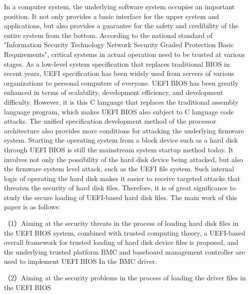 
\begin{eabstract}
In a computer system, the underlying software system occupies an important position. It not only 
provides a basic interface for the upper system and applications, but also provides a guarantee for 
the safety and credibility of the entire system from the bottom.
According to the national standard of 
"Information Security Technology Network Security Graded Protection Basic Requirements", critical 
systems in actual operation need to be trusted at various stages. As a low-level system specification 
that replaces traditional BIOS in recent years, UEFI specification has been widely used from servers 
of various organizations to personal computers of everyone. UEFI BIOS has been greatly enhanced in 
terms of scalability, development efficiency, and development difficulty. However, it is this C 
language that replaces the traditional assembly language program, which makes UEFI BIOS also subject 
to C language code attacks. The unified specification development method of the processor 
architecture also provides more conditions for attacking the underlying firmware system. 
Starting the operating system from a block device such as a hard disk through UEFI BIOS is 
still the mainstream system startup method today. It involves not only the possibility of the 
hard disk device being attacked, but also the firmware system level attack, such as the UEFI 
file system. Such internal logic of operating the hard disk makes it easier to receive 
targeted attacks that threaten the security of hard disk files. Therefore, it is of great 
significance to study the secure loading of UEFI-based hard disk files. The main work of this 
paper is as follows:
\par （1）Aiming at the security threats in the process of loading hard disk files in the UEFI BIOS 
system, combined with trusted computing theory, a UEFI-based overall framework for trusted loading 
of hard disk device files is proposed, and the underlying trusted platform BMC and baseboard 
management controller are used to implement UEFI BIOS In the BMC driver.
\par （2）Aiming at the security problems in the process of loading the driver files in the UEFI BIOS 

\end{eabstract}
